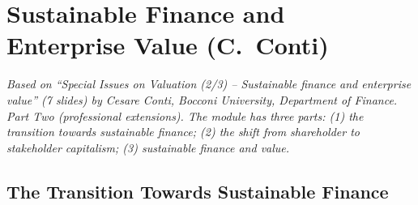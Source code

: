 \chapter[Sustainable Finance and Enterprise Value (C.\ Conti)]{Sustainable Finance and\\Enterprise Value (C.\ Conti)}\label{ch:sustainable}

\emph{Based on ``Special Issues on Valuation (2/3) -- Sustainable finance and enterprise value'' (7 slides) by Cesare Conti, Bocconi University, Department of Finance. Part Two (professional extensions). The module has three parts: (1) the transition towards sustainable finance; (2) the shift from shareholder to stakeholder capitalism; (3) sustainable finance and value.}

\providecommand{\inpractice}[1]{\par\smallskip\noindent{\small\textcolor{keyred}{\textbf{In practice}}\quad\emph{#1}}\par\smallskip}

\section{The Transition Towards Sustainable Finance}

